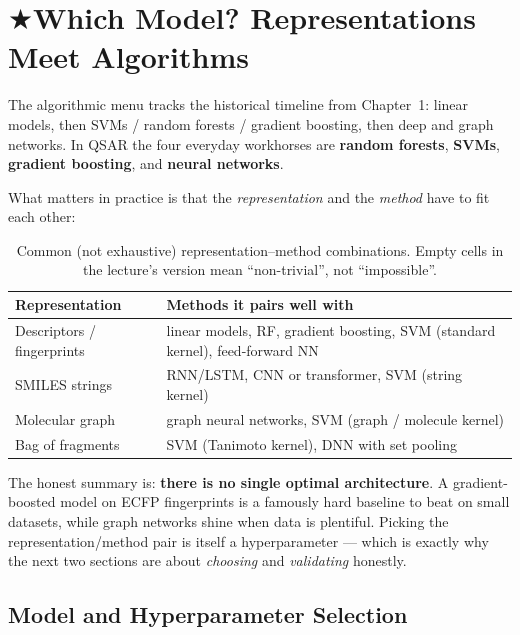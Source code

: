 \documentclass[11pt, oneside]{book}
\makeatletter
\newcommand{\starglyph}{\textcolor{stargold}{\ensuremath{\bigstar}}}
\newcommand{\starsec}[1]{%
  \texorpdfstring{\starglyph\hspace{0.4em}\textcolor{star@frame}{#1}}{#1}}
\makeatother
\begin{document}
\section{\starsec{Which Model? Representations Meet Algorithms}}

The algorithmic menu tracks the historical timeline from Chapter~1: linear models,
then SVMs / random forests / gradient boosting, then deep and graph networks. In
QSAR the four everyday workhorses are \textbf{random forests}, \textbf{SVMs},
\textbf{gradient boosting}, and \textbf{neural networks}.

What matters in practice is that the \emph{representation} and the \emph{method}
have to fit each other:

\begin{table}[H]
\centering
\small
\begin{tabular}{l p{8.4cm}}
\toprule
\textbf{Representation} & \textbf{Methods it pairs well with} \\
\midrule
Descriptors / fingerprints & linear models, RF, gradient boosting, SVM (standard kernel), feed-forward NN \\
SMILES strings             & RNN/LSTM, CNN or transformer, SVM (string kernel) \\
Molecular graph            & graph neural networks, SVM (graph / molecule kernel) \\
Bag of fragments           & SVM (Tanimoto kernel), DNN with set pooling \\
\bottomrule
\end{tabular}
\caption{Common (not exhaustive) representation--method combinations. Empty cells
in the lecture's version mean ``non-trivial'', not ``impossible''.}
\end{table}

\begin{intbox}
The honest summary is: \textbf{there is no single optimal architecture}. A
gradient-boosted model on ECFP fingerprints is a famously hard baseline to beat on
small datasets, while graph networks shine when data is plentiful. Picking the
representation/method pair is itself a hyperparameter --- which is exactly why the
next two sections are about \emph{choosing} and \emph{validating} honestly.
\end{intbox}

\subsection{Model and Hyperparameter Selection}
\end{document}
